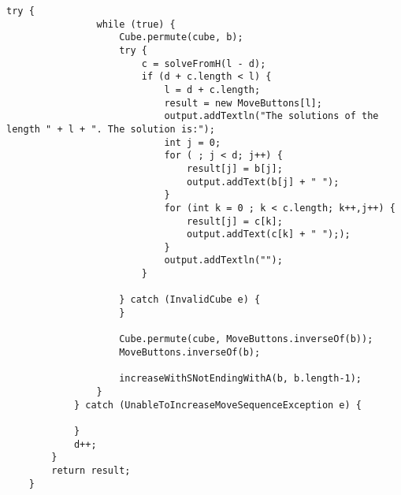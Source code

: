 \begin{verbatim}
try {
				while (true) {
					Cube.permute(cube, b);
					try {
						c = solveFromH(l - d);
						if (d + c.length < l) {
							l = d + c.length;
							result = new MoveButtons[l];
							output.addTextln("The solutions of the length " + l + ". The solution is:");
							int j = 0;
							for ( ; j < d; j++) {
								result[j] = b[j];
								output.addText(b[j] + " ");
							} 
							for (int k = 0 ; k < c.length; k++,j++) {
								result[j] = c[k];
								output.addText(c[k] + " "););
							}
							output.addTextln("");
						}

					} catch (InvalidCube e) {
					}
					
					Cube.permute(cube, MoveButtons.inverseOf(b));
					MoveButtons.inverseOf(b);					
					
					increaseWithSNotEndingWithA(b, b.length-1);
				}
			} catch (UnableToIncreaseMoveSequenceException e) {

			}
			d++;
		}
		return result;
	}
\end{verbatim}